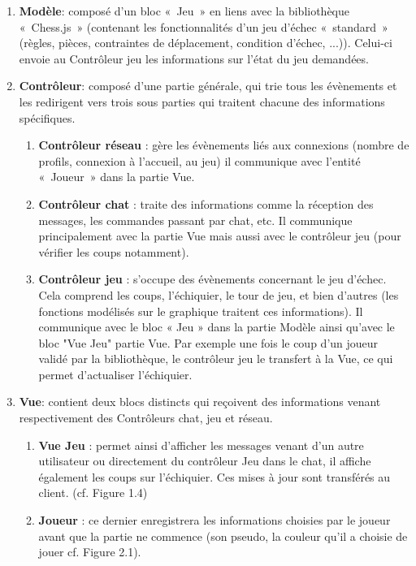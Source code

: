 \documentclass[12pt, openany]{report}
\begin{document}
\begin{enumerate}

    \item \textbf {Modèle}: composé d’un bloc « Jeu » en liens avec la bibliothèque « Chess.js » (contenant les fonctionnalités d’un jeu d’échec « standard » (règles, pièces, contraintes de déplacement, condition d’échec, ...)). Celui-ci envoie au Contrôleur jeu les informations sur l'état du jeu demandées.
    \item \textbf {Contrôleur}: composé d'une partie générale, qui trie tous les évènements et les redirigent vers trois sous parties qui traitent chacune des informations spécifiques.
    \begin{enumerate}
        \item \textbf {Contrôleur réseau} : gère les évènements liés aux connexions (nombre de profils, connexion à l’accueil, au jeu) il communique avec l’entité « Joueur » dans la partie Vue.
         \item \textbf {Contrôleur chat} : traite des informations comme la réception des messages, les commandes passant par chat, etc. Il communique principalement avec la partie Vue mais aussi avec le contrôleur jeu (pour vérifier les coups notamment).
          \item \textbf {Contrôleur jeu} : s'occupe des évènements concernant le jeu d’échec. Cela comprend les coups, l’échiquier, le tour de jeu, et bien d’autres (les fonctions modélisés sur le graphique traitent ces informations). Il communique avec le bloc « Jeu » dans la partie Modèle ainsi qu'avec le bloc "Vue Jeu" partie Vue. Par exemple une fois le coup d'un joueur validé par la bibliothèque, le contrôleur jeu le transfert à la Vue, ce qui permet d’actualiser l’échiquier.
     \end{enumerate}{}
    \item \textbf {Vue}: contient deux blocs distincts qui reçoivent des informations venant respectivement des Contrôleurs chat, jeu et réseau.
    \begin{enumerate}
        \item \textbf {Vue Jeu} : permet ainsi d’afficher les messages venant d’un autre utilisateur ou directement du contrôleur Jeu dans le chat, il affiche également les coups sur l’échiquier. Ces mises à jour sont transférés au client. (cf. Figure 1.4)
        \item \textbf {Joueur} : ce dernier enregistrera les informations choisies par le joueur avant que la partie ne commence (son pseudo, la couleur qu’il a choisie de jouer  cf. Figure 2.1).
    \end{enumerate}{}
\end{enumerate}
\end{document}
